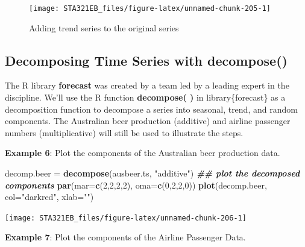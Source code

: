 \documentclass[
]{book}
\newenvironment{Shaded}{\begin{snugshade}}{\end{snugshade}}
\newcommand{\AttributeTok}[1]{\textcolor[rgb]{0.13,0.29,0.53}{#1}}
\newcommand{\DecValTok}[1]{\textcolor[rgb]{0.00,0.00,0.81}{#1}}
\newcommand{\DocumentationTok}[1]{\textcolor[rgb]{0.56,0.35,0.01}{\textbf{\textit{#1}}}}
\newcommand{\FunctionTok}[1]{\textcolor[rgb]{0.13,0.29,0.53}{\textbf{#1}}}
\newcommand{\NormalTok}[1]{#1}
\newcommand{\OtherTok}[1]{\textcolor[rgb]{0.56,0.35,0.01}{#1}}
\newcommand{\StringTok}[1]{\textcolor[rgb]{0.31,0.60,0.02}{#1}}
\begin{document}
\begin{figure}

{\centering \texttt{[image: STA321EB\_files/figure-latex/unnamed-chunk-205-1]} 

}

\caption{Adding trend series to the original series}\label{fig:unnamed-chunk-205}
\end{figure}

\hypertarget{decomposing-time-series-with-decompose}{%
\subsection{\texorpdfstring{Decomposing Time Series with \textbf{decompose()}}{Decomposing Time Series with decompose()}}\label{decomposing-time-series-with-decompose}}

The R library \textbf{forecast} was created by a team led by a leading expert in the discipline. We'll use the R function \textbf{decompose( )} in library\{forecast\} as a decomposition function to decompose a series into seasonal, trend, and random components. The Australian beer production (additive) and airline passenger numbers (multiplicative) will still be used to illustrate the steps.

\textbf{Example 6}: Plot the components of the Australian beer production data.

\begin{Shaded}
\begin{Highlighting}[]
\NormalTok{decomp.beer }\OtherTok{=} \FunctionTok{decompose}\NormalTok{(ausbeer.ts, }\StringTok{"additive"}\NormalTok{)}
\DocumentationTok{\#\# plot the decomposed components}
\FunctionTok{par}\NormalTok{(}\AttributeTok{mar=}\FunctionTok{c}\NormalTok{(}\DecValTok{2}\NormalTok{,}\DecValTok{2}\NormalTok{,}\DecValTok{2}\NormalTok{,}\DecValTok{2}\NormalTok{), }\AttributeTok{oma=}\FunctionTok{c}\NormalTok{(}\DecValTok{0}\NormalTok{,}\DecValTok{2}\NormalTok{,}\DecValTok{2}\NormalTok{,}\DecValTok{0}\NormalTok{))}
\FunctionTok{plot}\NormalTok{(decomp.beer, }\AttributeTok{col=}\StringTok{"darkred"}\NormalTok{, }\AttributeTok{xlab=}\StringTok{""}\NormalTok{)}
\end{Highlighting}
\end{Shaded}

\begin{center}\texttt{[image: STA321EB\_files/figure-latex/unnamed-chunk-206-1]} \end{center}

\textbf{Example 7}: Plot the components of the Airline Passenger Data.
\end{document}
